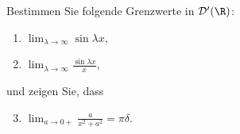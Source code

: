 
\begin{exercise}

Bestimmen Sie folgende Grenzwerte in $\mathcal{D}^\prime(\R)$:

\begin{enumerate}[label = (\roman*)]
    \item $\lim_{\lambda \to \infty} \sin{\lambda x}$,
    \item $\lim_{\lambda \to \infty} \frac{\sin{\lambda x}}{x}$, \\
\end{enumerate}

und zeigen Sie, dass

\begin{enumerate}[label = (\roman*)]
    \setcounter{enumi}{2}
    \item $\lim_{a \to 0+} \frac{a}{x^2 + a^2} = \pi \delta$.
\end{enumerate}


\end{exercise}


